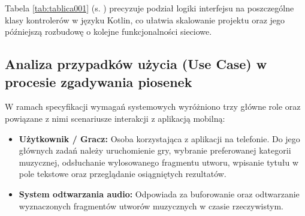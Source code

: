 Tabela \ref{tab:tablica001} (s. \pageref{tab:tablica001}) precyzuje podział logiki interfejsu na poszczególne klasy kontrolerów w języku Kotlin, co ułatwia skalowanie projektu oraz jego późniejszą rozbudowę o kolejne funkcjonalności sieciowe.

\subsection{Analiza przypadków użycia (Use Case) w procesie zgadywania piosenek}

\hspace{0.60cm}W ramach specyfikacji wymagań systemowych wyróżniono trzy główne role oraz powiązane z nimi scenariusze interakcji z aplikacją mobilną:

\begin{itemize}
    \item \textbf{Użytkownik / Gracz:} Osoba korzystająca z aplikacji na telefonie. Do jego głównych zadań należy uruchomienie gry, wybranie preferowanej kategorii muzycznej, odsłuchanie wylosowanego fragmentu utworu, wpisanie tytułu w pole tekstowe oraz przeglądanie osiągniętych rezultatów.
    \item \textbf{System odtwarzania audio:} Odpowiada za buforowanie oraz odtwarzanie wyznaczonych fragmentów utworów muzycznych w czasie rzeczywistym.
\end{itemize}